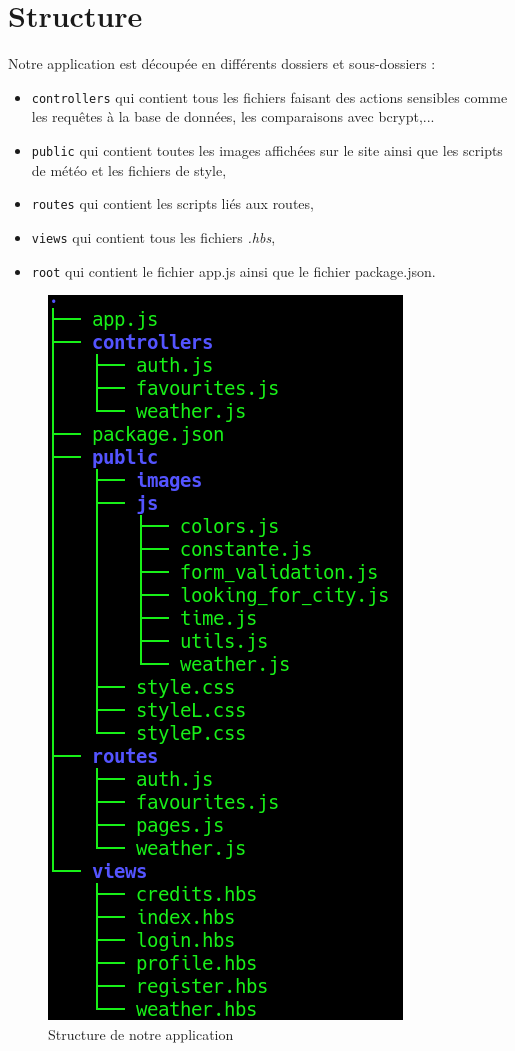 \documentclass[12pt, french]{article}
\begin{document}
	\section{Structure}
	Notre application est découpée en différents dossiers et sous-dossiers :
	\begin{itemize}
	    \item \texttt{controllers} qui contient tous les fichiers faisant des actions sensibles comme les requêtes à la base de données, les comparaisons avec bcrypt,...
	    \item \texttt{public} qui contient toutes les images affichées sur le site ainsi que les scripts de météo et les fichiers de style,
	    \item \texttt{routes} qui contient les scripts liés aux routes, 
	    \item \texttt{views} qui contient tous les fichiers \textit{.hbs},
	    \item \texttt{root} qui contient le fichier app.js ainsi que le fichier package.json.
	\end{itemize}
	\newpage
	\begin{figure}[!h]
	    \centering
	    \includegraphics[width=.3\linewidth]{images/tree.png}
	    \caption{Structure de notre application}
	    \label{fig:tree}
	\end{figure}
	\newpage
\end{document}
